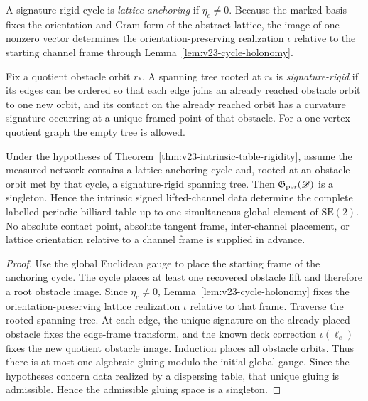 \begin{definition}
\label{def:v23-lattice-anchoring-cycle}
A signature-rigid cycle is \emph{lattice-anchoring} if \(\eta_c\ne0\).
Because the marked basis fixes the orientation and Gram form of the abstract
lattice, the image of one nonzero vector determines the
orientation-preserving realization \(\iota\) relative to the starting channel
frame through Lemma~\ref{lem:v23-cycle-holonomy}.
\end{definition}

\begin{definition}
\label{def:v23-signature-rigid-tree}
Fix a quotient obstacle orbit \(r_*\).  A spanning tree rooted at \(r_*\) is
\emph{signature-rigid} if its edges can be ordered so that each edge joins an
already reached obstacle orbit to one new orbit, and its contact on the already
reached orbit has a curvature signature occurring at a unique framed point of
that obstacle.  For a one-vertex quotient graph the empty tree is allowed.
\end{definition}

\begin{corollary}
\label{cor:v23-signature-rigid-global}
Under the hypotheses of Theorem~\ref{thm:v23-intrinsic-table-rigidity}, assume
the measured network contains a lattice-anchoring cycle and, rooted at an
obstacle orbit met by that cycle, a signature-rigid spanning tree.  Then
\(\mathfrak G_{\rm per}(\mathscr D)\) is a singleton.  Hence the intrinsic
signed lifted-channel data determine the complete labelled periodic billiard
table up to one simultaneous global element of \(\mathrm{SE}(2)\).  No
absolute contact point, absolute tangent frame, inter-channel placement, or
lattice orientation relative to a channel frame is supplied in advance.
\end{corollary}

\begin{proof}
Use the global Euclidean gauge to place the starting frame of the anchoring
cycle.  The cycle places at least one recovered obstacle lift and therefore a
root obstacle image.  Since \(\eta_c\ne0\),
Lemma~\ref{lem:v23-cycle-holonomy} fixes the orientation-preserving lattice
realization \(\iota\) relative to that frame.  Traverse the rooted spanning
tree.  At each edge, the unique signature on the already placed obstacle fixes
the edge-frame transform, and the known deck correction
\(\iota(\ell_e)\) fixes the new quotient obstacle image.  Induction places all
obstacle orbits.  Thus there is at most one algebraic gluing modulo the initial
global gauge.  Since the hypotheses concern data realized by a dispersing
table, that unique gluing is admissible.  Hence the admissible gluing space is
a singleton.
\end{proof}

